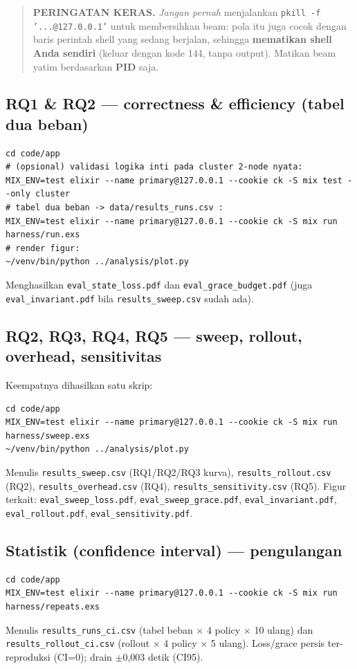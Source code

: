 \documentclass[11pt]{article}
\newcommand{\code}[1]{\texttt{\small #1}}
\begin{document}
\begin{quote}
\textbf{PERINGATAN KERAS.} \emph{Jangan pernah} menjalankan
\code{pkill -f '...@127.0.0.1'} untuk membersihkan beam: pola itu juga cocok dengan baris perintah
shell yang sedang berjalan, sehingga \textbf{mematikan shell Anda sendiri} (keluar dengan kode 144,
tanpa output). Matikan beam yatim berdasarkan \textbf{PID} saja.
\end{quote}

\subsection{RQ1 \& RQ2 --- correctness \& efficiency (tabel dua beban)}
\begin{lstlisting}[style=sh]
cd code/app
# (opsional) validasi logika inti pada cluster 2-node nyata:
MIX_ENV=test elixir --name primary@127.0.0.1 --cookie ck -S mix test --only cluster
# tabel dua beban -> data/results_runs.csv :
MIX_ENV=test elixir --name primary@127.0.0.1 --cookie ck -S mix run harness/run.exs
# render figur:
~/venv/bin/python ../analysis/plot.py
\end{lstlisting}
Menghasilkan \code{eval\_state\_loss.pdf} dan \code{eval\_grace\_budget.pdf} (juga
\code{eval\_invariant.pdf} bila \code{results\_sweep.csv} sudah ada).

\subsection{RQ2, RQ3, RQ4, RQ5 --- sweep, rollout, overhead, sensitivitas}
Keempatnya dihasilkan satu skrip:
\begin{lstlisting}[style=sh]
cd code/app
MIX_ENV=test elixir --name primary@127.0.0.1 --cookie ck -S mix run harness/sweep.exs
~/venv/bin/python ../analysis/plot.py
\end{lstlisting}
Menulis \code{results\_sweep.csv} (RQ1/RQ2/RQ3 kurva), \code{results\_rollout.csv} (RQ2),
\code{results\_overhead.csv} (RQ4), \code{results\_sensitivity.csv} (RQ5). Figur terkait:
\code{eval\_sweep\_loss.pdf}, \code{eval\_sweep\_grace.pdf}, \code{eval\_invariant.pdf},
\code{eval\_rollout.pdf}, \code{eval\_sensitivity.pdf}.

\subsection{Statistik (confidence interval) --- pengulangan}
\begin{lstlisting}[style=sh]
cd code/app
MIX_ENV=test elixir --name primary@127.0.0.1 --cookie ck -S mix run harness/repeats.exs
\end{lstlisting}
Menulis \code{results\_runs\_ci.csv} (tabel beban $\times$ 4 policy $\times$ 10 ulang) dan
\code{results\_rollout\_ci.csv} (rollout $\times$ 4 policy $\times$ 5 ulang). Loss/grace persis
ter-reproduksi (CI=0); drain $\pm$0{,}003 detik (CI95).
\end{document}
